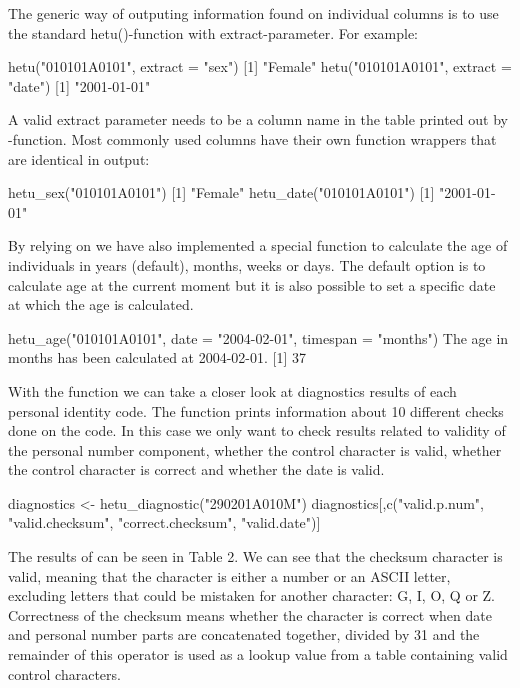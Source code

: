 The generic way of outputing information found on individual columns is to use the standard hetu()-function with extract-parameter. For example:

\begin{example}
  hetu("010101A0101", extract = "sex")
  [1] "Female"
  hetu("010101A0101", extract = "date")
  [1] "2001-01-01"
\end{example}

A valid extract parameter needs to be a column name in the table printed out by -function. Most commonly used columns have their own function wrappers that are identical in output:

\begin{example}
  hetu_sex("010101A0101")
  [1] "Female"
  hetu_date("010101A0101")
  [1] "2001-01-01"
\end{example}

By relying on  we have also implemented a special function to calculate the age of individuals in years (default), months, weeks or days. The default option is to calculate age at the current moment but it is also possible to set a specific date at which the age is calculated.

\begin{example}
  hetu_age("010101A0101", date = "2004-02-01", timespan = "months")
  The age in months has been calculated at 2004-02-01.
  [1] 37
\end{example}

With the  function we can take a closer look at diagnostics results of each personal identity code. The function prints information about 10 different checks done on the code. In this case we only want to check results related to validity of the personal number component, whether the control character is valid, whether the control character is correct and whether the date is valid.

\begin{example}
  diagnostics <- hetu_diagnostic("290201A010M")
  diagnostics[,c("valid.p.num", "valid.checksum", "correct.checksum", "valid.date")]
\end{example}

The results of  can be seen in Table 2. We can see that the checksum character is valid, meaning that the character is either a number or an ASCII letter, excluding letters that could be mistaken for another character: G, I, O, Q or Z. Correctness of the checksum means whether the character is correct when date and personal number parts are concatenated together, divided by 31 and the remainder of this operator is used as a lookup value from a table containing valid control characters.

